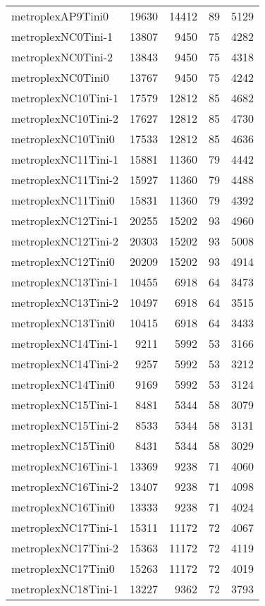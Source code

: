 \begin{tabular}{lrrrr}
metroplexAP9Tini0 & 19630 & 14412 & 89 & 5129 \\
metroplexNC0Tini-1 & 13807 & 9450 & 75 & 4282 \\
metroplexNC0Tini-2 & 13843 & 9450 & 75 & 4318 \\
metroplexNC0Tini0 & 13767 & 9450 & 75 & 4242 \\
metroplexNC10Tini-1 & 17579 & 12812 & 85 & 4682 \\
metroplexNC10Tini-2 & 17627 & 12812 & 85 & 4730 \\
metroplexNC10Tini0 & 17533 & 12812 & 85 & 4636 \\
metroplexNC11Tini-1 & 15881 & 11360 & 79 & 4442 \\
metroplexNC11Tini-2 & 15927 & 11360 & 79 & 4488 \\
metroplexNC11Tini0 & 15831 & 11360 & 79 & 4392 \\
metroplexNC12Tini-1 & 20255 & 15202 & 93 & 4960 \\
metroplexNC12Tini-2 & 20303 & 15202 & 93 & 5008 \\
metroplexNC12Tini0 & 20209 & 15202 & 93 & 4914 \\
metroplexNC13Tini-1 & 10455 & 6918 & 64 & 3473 \\
metroplexNC13Tini-2 & 10497 & 6918 & 64 & 3515 \\
metroplexNC13Tini0 & 10415 & 6918 & 64 & 3433 \\
metroplexNC14Tini-1 & 9211 & 5992 & 53 & 3166 \\
metroplexNC14Tini-2 & 9257 & 5992 & 53 & 3212 \\
metroplexNC14Tini0 & 9169 & 5992 & 53 & 3124 \\
metroplexNC15Tini-1 & 8481 & 5344 & 58 & 3079 \\
metroplexNC15Tini-2 & 8533 & 5344 & 58 & 3131 \\
metroplexNC15Tini0 & 8431 & 5344 & 58 & 3029 \\
metroplexNC16Tini-1 & 13369 & 9238 & 71 & 4060 \\
metroplexNC16Tini-2 & 13407 & 9238 & 71 & 4098 \\
metroplexNC16Tini0 & 13333 & 9238 & 71 & 4024 \\
metroplexNC17Tini-1 & 15311 & 11172 & 72 & 4067 \\
metroplexNC17Tini-2 & 15363 & 11172 & 72 & 4119 \\
metroplexNC17Tini0 & 15263 & 11172 & 72 & 4019 \\
metroplexNC18Tini-1 & 13227 & 9362 & 72 & 3793 \\

\end{tabular}
